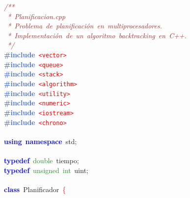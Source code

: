 \noindent
\mbox{}\textit{\textcolor{Brown}{/**}} \\
\mbox{}\textit{\textcolor{Brown}{\ *\ Planificacion.cpp}} \\
\mbox{}\textit{\textcolor{Brown}{\ *\ Problema\ de\ planificación\ en\ multiprocesadores.}} \\
\mbox{}\textit{\textcolor{Brown}{\ *\ Implementación\ de\ un\ algoritmo\ backtracking\ en\ C++.}} \\
\mbox{}\textit{\textcolor{Brown}{\ */}} \\
\mbox{}\textbf{\textcolor{RoyalBlue}{\#include}}\ \texttt{\textcolor{Red}{\textless{}vector\textgreater{}}} \\
\mbox{}\textbf{\textcolor{RoyalBlue}{\#include}}\ \texttt{\textcolor{Red}{\textless{}queue\textgreater{}}} \\
\mbox{}\textbf{\textcolor{RoyalBlue}{\#include}}\ \texttt{\textcolor{Red}{\textless{}stack\textgreater{}}} \\
\mbox{}\textbf{\textcolor{RoyalBlue}{\#include}}\ \texttt{\textcolor{Red}{\textless{}algorithm\textgreater{}}} \\
\mbox{}\textbf{\textcolor{RoyalBlue}{\#include}}\ \texttt{\textcolor{Red}{\textless{}utility\textgreater{}}} \\
\mbox{}\textbf{\textcolor{RoyalBlue}{\#include}}\ \texttt{\textcolor{Red}{\textless{}numeric\textgreater{}}} \\
\mbox{}\textbf{\textcolor{RoyalBlue}{\#include}}\ \texttt{\textcolor{Red}{\textless{}iostream\textgreater{}}} \\
\mbox{}\textbf{\textcolor{RoyalBlue}{\#include}}\ \texttt{\textcolor{Red}{\textless{}chrono\textgreater{}}} \\
\mbox{} \\
\mbox{}\textbf{\textcolor{Blue}{using}}\ \textbf{\textcolor{Blue}{namespace}}\ std\textcolor{BrickRed}{;} \\
\mbox{} \\
\mbox{}\textbf{\textcolor{Blue}{typedef}}\ \textcolor{ForestGreen}{double}\ tiempo\textcolor{BrickRed}{;} \\
\mbox{}\textbf{\textcolor{Blue}{typedef}}\ \textcolor{ForestGreen}{unsigned}\ \textcolor{ForestGreen}{int}\ uint\textcolor{BrickRed}{;} \\
\mbox{} \\
\mbox{}\textbf{\textcolor{Blue}{class}}\ \textcolor{TealBlue}{Planificador}\ \textcolor{Red}{\{} \\
